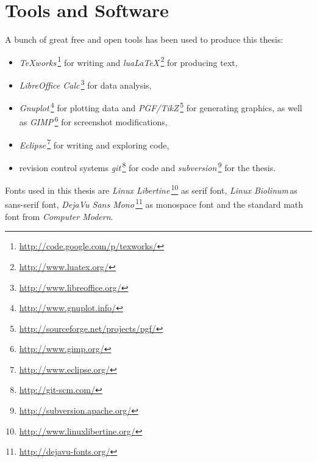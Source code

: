 \section*{Tools and Software}
A bunch of great free and open tools has been used to produce this thesis:
%
\begin{itemize}
	\item \emph{\TeX works}\,\footnote{\url{http://code.google.com/p/texworks/}} for writing and \emph{lua\LaTeX}\,\footnote{\url{http://www.luatex.org/}} for producing text,
	\item \emph{LibreOffice Calc}\,\footnote{\url{http://www.libreoffice.org/}} for data analysis,
	\item \emph{Gnuplot}\,\footnote{\url{http://www.gnuplot.info/}} for plotting data and \emph{PGF/TikZ}\,\footnote{\url{http://sourceforge.net/projects/pgf/}} for generating graphics, as well as \emph{GIMP}\,\footnote{\url{http://www.gimp.org/}} for screenshot modifications,
	\item \emph{Eclipse}\,\footnote{\url{http://www.eclipse.org/}} for writing and exploring code,
	\item revision control systems \emph{git}\,\footnote{\url{http://git-scm.com/}} for code and \emph{subversion}\,\footnote{\url{http://subversion.apache.org/}} for the thesis.
\end{itemize}
Fonts used in this thesis are \emph{Linux Libertine}\,\footnote{\url{http://www.linuxlibertine.org/}} as serif font, \emph{Linux Biolinum}\,\footnotemark as sans-serif font, \emph{DejaVu Sans Mono}\,\footnote{\url{http://dejavu-fonts.org/}} as monospace font and the standard math font from \emph{Computer Modern}.

%
%
\newpage
